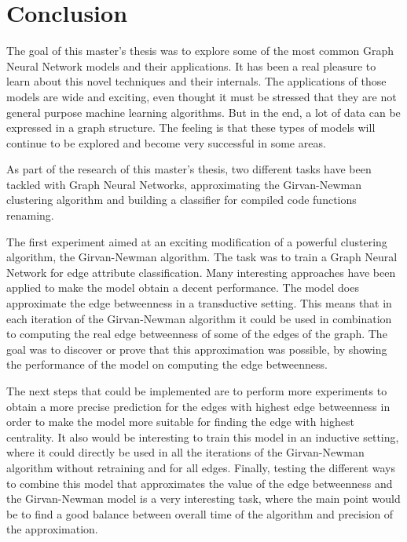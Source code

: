 \newpage
\section{Conclusion}


The goal of this master's thesis was to explore some of the most common Graph Neural Network models and their applications. It has been a real pleasure to learn about this novel techniques and their internals. The applications of those models are wide and exciting, even thought it must be stressed that they are not general purpose machine learning algorithms. But in the end, a lot of data can be expressed in a graph structure. The feeling is that these types of models will continue to be explored and become very successful in some areas.


As part of the research of this master's thesis, two different tasks have been tackled with Graph Neural Networks, approximating the Girvan-Newman clustering algorithm and building a classifier for compiled code functions renaming.

The first experiment aimed at an exciting modification of a powerful clustering algorithm, the Girvan-Newman algorithm. The task was to train a Graph Neural Network for edge attribute classification. Many interesting approaches have been applied to make the model obtain a decent performance. The model does approximate the edge betweenness in a transductive setting. This means that in each iteration of the Girvan-Newman algorithm it could be used in combination to computing the real edge betweenness of some of the edges of the graph. The goal was to discover or prove that this approximation was possible, by showing the performance of the model on computing the edge betweenness.

The next steps that could be implemented are to perform more experiments to obtain a more precise prediction for the edges with highest edge betweenness in order to make the model more suitable for finding the edge with highest centrality. It also would be interesting to train this model in an inductive setting, where it could directly be used in all the iterations of the Girvan-Newman algorithm without retraining and for all edges. Finally, testing the different ways to combine this model that approximates the value of the edge betweenness and the Girvan-Newman model is a very interesting task, where the main point would be to find a good balance between overall time of the algorithm and precision of the approximation.

